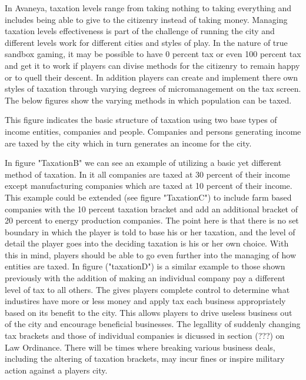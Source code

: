 In Avaneya, taxation levels range from taking nothing to taking everything and includes being able to give to the citizenry instead of taking money. Managing taxation levels effectiveness is part of the challenge of running the city and different levels work for different cities and styles of play. In the nature of true sandbox gaming, it may be possible to have 0 percent tax or even 100 percent tax and get it to work if players can divise methods for the citizenry to remain happy or to quell their descent. In addition players can create and implement there own styles of taxation through varying degrees of micromanagement on the tax screen. The below figures show the varying methods in which population can be taxed.

This figure indicates the basic structure of taxation using two base types of income entities, companies and people. Companies and persons generating income are taxed by the city which in turn generates an income for the city.  

In figure "TaxationB" we can see an example of utilizing a basic yet different method of taxation. In it all companies are taxed at 30 percent of their income except manufacturing companies which are taxed at 10 percent of their income. This example could be extended (see figure "TaxationC") to include farm based companies with the 10 percent taxation bracket and add an additional bracket of 20 percent to energy production companies. The point here is that there is no set boundary in which the player is told to base his or her taxation, and the level of detail the player goes into the deciding taxation is his or her own choice. With this in mind, players should be able to go even further into the managing of how entities are taxed. 
In figure ("taxationD") is a similar example to those shown previously with the addition of making an individual company pay a different level of tax to all others. The gives players complete control to determine what industires have more or less money and apply tax each business appropriately based on its benefit to the city. This allows players to drive useless business out of the city and encourage beneficial businesses. The legallity of suddenly changing tax brackets and those of individual companies is dicussed in section (???) on Law Ordinance. There will be times where breaking various business deals, including the altering of taxation brackets, may incur fines or inspire military action against a players city.

